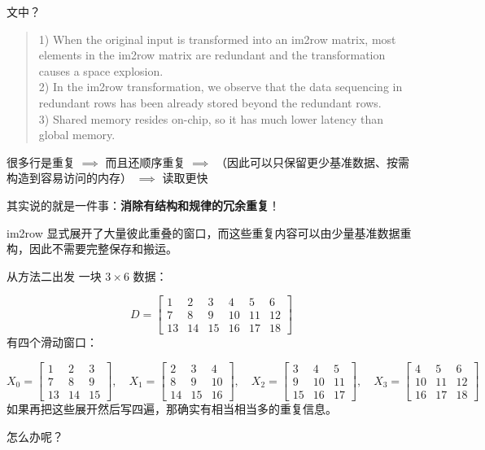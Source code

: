 \documentclass[aspectratio=169,10pt]{beamer}
\newenvironment{paperquote}{%
  \begin{quote}\small\itshape\color{black!72}%
}{%
  \end{quote}%
}
\providecommand{\cross}{\times}
\begin{document}
\begin{frame}[fragile]{文中？}
\begin{paperquote}
1) When the original input is transformed into an im2row matrix, most elements in the im2row matrix are redundant and the transformation causes a space explosion.\\2) In the im2row transformation, we observe that the data sequencing in redundant rows has been already stored beyond the redundant rows. \\3) Shared memory resides on-chip, so it has much lower latency than global memory.
\end{paperquote}
很多行是重复 $\implies$ 而且还顺序重复 $\implies$ （因此可以只保留更少基准数据、按需构造到容易访问的内存） $\implies$ 读取更快
\par
其实说的就是一件事：\textbf{消除有结构和规律的冗余重复}！
\par
im2row 显式展开了大量彼此重叠的窗口，而这些重复内容可以由少量基准数据重构，因此不需要完整保存和搬运。
\par
\end{frame}

\begin{frame}[fragile]{从方法二出发}
一块 $3\cross6$ 数据：
\par
\[
D=\begin{bmatrix}
1 & 2 & 3 & 4 & 5 & 6 \\
7 & 8 & 9 & 10 & 11 & 12 \\
13 & 14 & 15 & 16 & 17 & 18
\end{bmatrix}
\]
有四个滑动窗口：
\par
\[
X_0 =
\begin{bmatrix}
1 & 2 & 3 \\
7 & 8 & 9 \\
13 & 14 & 15
\end{bmatrix},
\quad
X_1 =
\begin{bmatrix}
2 & 3 & 4 \\
8 & 9 & 10 \\
14 & 15 & 16
\end{bmatrix},
\quad
X_2 =
\begin{bmatrix}
3 & 4 & 5 \\
9 & 10 & 11 \\
15 & 16 & 17
\end{bmatrix},
\quad
X_3 =
\begin{bmatrix}
4 & 5 & 6 \\
10 & 11 & 12 \\
16 & 17 & 18
\end{bmatrix}
\]
如果再把这些展开然后写四遍，那确实有相当相当多的重复信息。
\par
怎么办呢？
\par
\end{frame}
\end{document}
